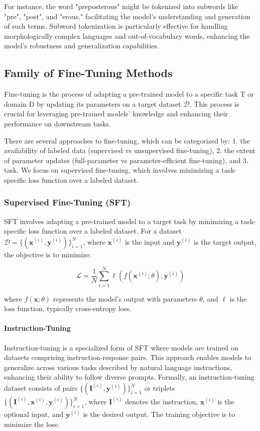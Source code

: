 \documentclass{article}
\newcounter{para}
\begin{document}
For instance, the word "preposterous" might be tokenized into subwords like "pre", "post", and "erous," facilitating the model's understanding and generation of such terms. Subword tokenization is particularly effective for handling morphologically complex languages and out-of-vocabulary words, enhancing the model's robustness and generalization capabilities.


\subsection{Family of Fine-Tuning Methods}
Fine-tuning is the process of adapting a pre-trained model to a specific task T or domain D by updating its parameters on a target dataset \(\mathcal{D}\). This process is crucial for leveraging pre-trained models' knowledge and enhancing their performance on downstream tasks.

There are several approaches to fine-tuning, which can be categorized by: 1. the availability of labeled data (supervised vs unsupervised fine-tuning), 2. the extent of parameter updates (full-parameter vs parameter-efficient fine-tuning), and 3. task. We focus on supervised fine-tuning, which involves minimizing a task-specific loss function over a labeled dataset.

\subsubsection{Supervised Fine-Tuning (SFT)}\label{sec:pre-sft}

SFT involves adapting a pre-trained model to a target task by minimizing a task-specific loss function over a labeled dataset. For a dataset \( \mathcal{D} = \{(\mathbf{x}^{(i)}, \mathbf{y}^{(i)})\}_{i=1}^N \), where \( \mathbf{x}^{(i)} \) is the input and \( \mathbf{y}^{(i)} \) is the target output, the objective is to minimize:

\[
\mathcal{L} = \frac{1}{N} \sum_{i=1}^N \ell(f(\mathbf{x}^{(i)}; \theta), \mathbf{y}^{(i)})
\]

where \( f(\mathbf{x}; \theta) \) represents the model's output with parameters \( \theta \), and \( \ell \) is the loss function, typically cross-entropy loss.

\paragraph{Instruction-Tuning} \label{sec:pre-it}

Instruction-tuning is a specialized form of SFT where models are trained on datasets comprising instruction-response pairs. This approach enables models to generalize across various tasks described by natural language instructions, enhancing their ability to follow diverse prompts. Formally, an instruction-tuning dataset consists of pairs \( \{(\mathbf{I}^{(i)}, \mathbf{y}^{(i)})\}_{i=1}^N \) or triplets \( \{(\mathbf{I}^{(i)}, \mathbf{x}^{(i)}, \mathbf{y}^{(i)})\}_{i=1}^N \), where \( \mathbf{I}^{(i)} \) denotes the instruction, \( \mathbf{x}^{(i)} \) is the optional input, and \( \mathbf{y}^{(i)} \) is the desired output. The training objective is to minimize the loss:
\end{document}
